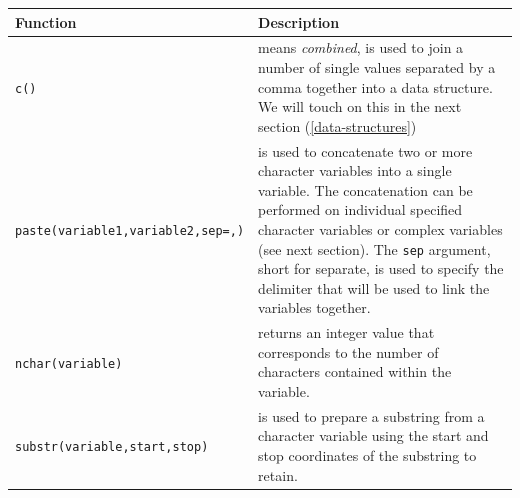 \documentclass[a4paper]{book}
\begin{document}
\begin{longtable}[]{@{}ll@{}}
\toprule
\begin{minipage}[b]{0.21\columnwidth}\raggedright\strut
Function\strut
\end{minipage} & \begin{minipage}[b]{0.73\columnwidth}\raggedright\strut
Description\strut
\end{minipage}\tabularnewline
\midrule
\endhead
\begin{minipage}[t]{0.21\columnwidth}\raggedright\strut
\texttt{c()}\strut
\end{minipage} & \begin{minipage}[t]{0.73\columnwidth}\raggedright\strut
means \emph{combined}, is used to join a number of single values
separated by a comma together into a data structure. We will touch on
this in the next section (\ref{data-structures})\strut
\end{minipage}\tabularnewline
\begin{minipage}[t]{0.21\columnwidth}\raggedright\strut
\texttt{paste(variable1,variable2,sep=\textquotesingle{},\textquotesingle{})}\strut
\end{minipage} & \begin{minipage}[t]{0.73\columnwidth}\raggedright\strut
is used to concatenate two or more character variables into a single
variable. The concatenation can be performed on individual specified
character variables or complex variables (see next section). The
\texttt{sep} argument, short for separate, is used to specify the
delimiter that will be used to link the variables together.\strut
\end{minipage}\tabularnewline
\begin{minipage}[t]{0.21\columnwidth}\raggedright\strut
\texttt{nchar(variable)}\strut
\end{minipage} & \begin{minipage}[t]{0.73\columnwidth}\raggedright\strut
returns an integer value that corresponds to the number of characters
contained within the variable.\strut
\end{minipage}\tabularnewline
\begin{minipage}[t]{0.21\columnwidth}\raggedright\strut
\texttt{substr(variable,start,stop)}\strut
\end{minipage} & \begin{minipage}[t]{0.73\columnwidth}\raggedright\strut
is used to prepare a substring from a character variable using the start
and stop coordinates of the substring to retain.\strut
\end{minipage}\tabularnewline

\end{longtable}
\end{document}
